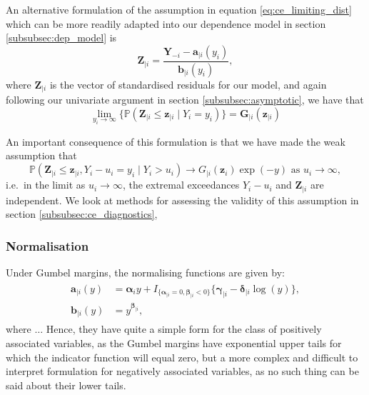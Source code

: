 \documentclass{article}
\numberwithin{equation}{section}
\begin{document}
An alternative formulation of the assumption in equation \ref{eq:ce_limiting_dist} which can be more readily adapted into our dependence model in section \ref{subsubsec:dep_model} is
\begin{equation} \label{eq:standardised_residuals}
  \bm{Z}_{\mid i} = \frac{\bm{Y}_{-i} - \bm{a}_{\mid i}(y_i)} {\bm{b}_{\mid i}(y_i)},
\end{equation}
where $\bm{Z}_{\mid i}$ is the vector of standardised residuals for our model, and again following our univariate argument in section \ref{subsubsec:asymptotic}, we have that
\[
      \lim_{y_i \rightarrow \infty}\{\mathbb{P}(\bm{Z}_{\mid i} \le \bm{z}_{\mid i} \mid Y_i = y_i)\} = \bm{G}_{\mid i}(\bm{z}_{\mid i})
\]

An important consequence of this formulation is that we have made the weak assumption that
\begin{equation} \label{eq:limit_independence}
\mathbb{P}(\bm{Z}_{\mid i} \le \bm{z}_{\mid i}, Y_i - u_i = y_i \mid Y_i > u_i) \rightarrow G_{\mid i}(\bm{z}_i) \exp(-y) \text{ as } u_i \rightarrow \infty,
\end{equation}
i.e.\ in the limit as $u_i \to \infty$, the extremal exceedances $Y_i - u_i$ and $\bm{Z}_{\mid i}$ are independent.
We look at methods for assessing the validity of this assumption in section \ref{subsubsec:ce_diagnostics},

\subsubsection{Normalisation} \label{subsubsec:ce_normalisation}

Under Gumbel margins, the normalising functions are given by:
\begin{align} \label{eq:gumbel_normalisation}
  \begin{split}
    \bm{a}_{\mid i}(y) &= \bm{\alpha}_i y + I_{\{\bm{\alpha}_{\mid i} = 0, \bm{\beta}_{\mid i} < 0\}} \{\bm{\gamma}_{\mid i} - \bm{\delta}_{\mid i}\log(y)\}, \\
    \bm{b}_{\mid i}(y) &= y^{\bm{\beta}_{\mid i}}, 
  \end{split}
 \end{align}
where $\ldots$ 
Hence, they have quite a simple form for the class of positively associated variables, as the Gumbel margins have exponential upper tails for which the indicator function will equal zero, but a more complex and difficult to interpret formulation for negatively associated variables, as no such thing can be said about their lower tails. 
\end{document}
